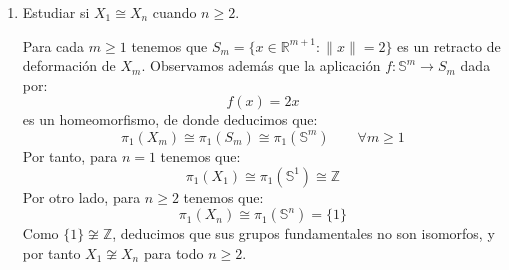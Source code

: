 \documentclass[12pt]{article}
\begin{document}
\begin{ejercicio}[7.5 puntos]
\begin{enumerate}[label=\alph*)]
                Por tanto, consideramos la siguiente aplicación:
                
                Esta aplicación es continua, y además cumple que $r(y) = y$ para todo $y\in S_n$, por lo que $r$ es una retracción de $X_n$ sobre $S_n$. Para ver que $S_n$ es un retracto de deformación de $X_n$, basta con observar que $H$ es una homotopía entre $\id_{X_n}$ y $i\circ r$, donde $i:S_n\hookrightarrow X_n$ es la inclusión canónica.
            \item Estudiar si $X_1 \cong X_n$ cuando $n\geq 2$.

                Para cada $m\geq 1$ tenemos que $S_m=\{x\in \mathbb{R}^{m+1}:\|x\|=2\}$ es un retracto de deformación de $X_m$. Observamos además que la aplicación $f:\mathbb{S}^m\to S_m$ dada por:
                \begin{equation*}
                    f(x) = 2x
                \end{equation*}
                es un homeomorfismo, de donde deducimos que:
                \begin{equation*}
                    \pi_1(X_m) \cong \pi_1(S_m) \cong \pi_1(\mathbb{S}^m) \qquad \forall m\geq 1
                \end{equation*}
                Por tanto, para $n=1$ tenemos que:
                \begin{equation*}
                    \pi_1(X_1) \cong \pi_1(\mathbb{S}^1) \cong \mathbb{Z}
                \end{equation*}
                Por otro lado, para $n\geq 2$ tenemos que:
                \begin{equation*}
                    \pi_1(X_n)\cong \pi_1(\mathbb{S}^n) = \{1\}
                \end{equation*}
                Como $\{1\}\not\cong \mathbb{Z}$, deducimos que sus grupos fundamentales no son isomorfos, y por tanto $X_1\not\cong X_n$ para todo $n\geq 2$.
        \end{enumerate}
    \end{ejercicio}
\end{document}
